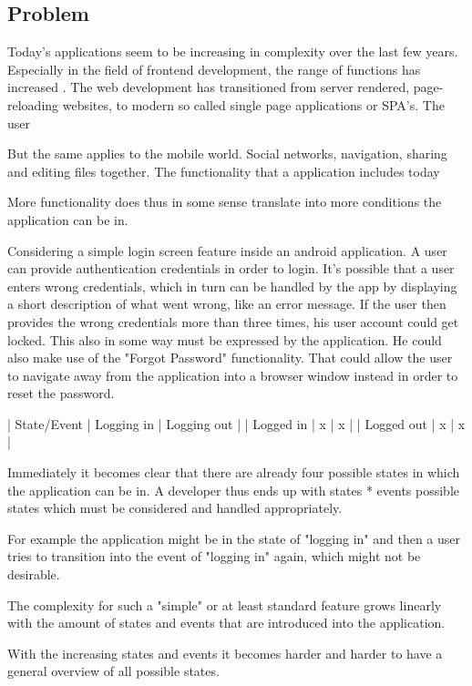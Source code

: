 \subsection{Problem}
\label{subsec:problem}

Today's applications seem to be increasing in complexity over the last few years. 
Especially in the field of frontend development, the range of functions has increased \cite{kevin2018}.
The web development has transitioned from server rendered, page-reloading websites, to modern so called single page applications or SPA's.
The user 

But the same applies to the mobile world. Social networks, navigation, sharing and editing files together.
The functionality that a application includes today

More functionality does thus in some sense translate into more conditions the application can be in. 

Considering a simple login screen feature inside an android application. A user can provide authentication credentials
in order to login. It's possible that a user enters wrong credentials, which in turn can be handled by the app by displaying
a short description of what went wrong, like an error message.
If the user then provides the wrong credentials more than three times, his user account could get locked. 
This also in some way must be expressed by the application.
He could also make use of the "Forgot Password" functionality. That could allow the user to navigate away from the application
into a browser window instead in order to reset the password.

| State/Event | Logging in | Logging out |
| Logged in | x | x |
| Logged out | x | x |

Immediately it becomes clear that there are already four possible states in which the application can be in.
A developer thus ends up with states * events possible states which must be considered and handled appropriately.

For example the application might be in the state of "logging in" and then a user tries to transition into
the event of "logging in" again, which might not be desirable.
 
The complexity for such a "simple" or at least standard feature grows linearly with the amount
of states and events that are introduced into the application.

With the increasing states and events it becomes harder and harder to have a general overview of all
possible states.

